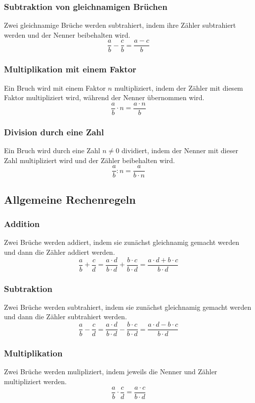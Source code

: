 \subsubsection{Subtraktion von gleichnamigen Brüchen}
Zwei gleichnamige Brüche werden subtrahiert, indem ihre Zähler subtrahiert werden und der Nenner beibehalten wird.
	\[\frac{a}{b} - \frac{c}{b} = \frac{a-c}{b}\]
	
\subsubsection{Multiplikation mit einem Faktor}
Ein Bruch wird mit einem Faktor $n$ multipliziert, indem der Zähler mit diesem Faktor multipliziert wird, während der Nenner übernommen wird.
	\[\frac{a}{b} \cdot n = \frac{a \cdot n}{b}\]
	
\subsubsection{Division durch eine Zahl}
Ein Bruch wird durch eine Zahl $n \neq 0$ dividiert, indem der Nenner mit dieser Zahl multipliziert wird und der Zähler beibehalten wird.
	\[\frac{a}{b} : n = \frac{a}{b \cdot n}\]

\subsection{Allgemeine Rechenregeln}
\subsubsection{Addition}
Zwei Brüche werden addiert, indem sie zunächst gleichnamig gemacht werden und dann die Zähler addiert werden.
	\[\frac{a}{b} + \frac{c}{d} = \frac{a \cdot d}{b \cdot d} + \frac{b \cdot c}{b \cdot d} = \frac{a \cdot d + b \cdot c}{b \cdot d} \]
	
\subsubsection{Subtraktion}
Zwei Brüche werden subtrahiert, indem sie zunächst gleichnamig gemacht werden und dann die Zähler subtrahiert werden.
	\[\frac{a}{b} - \frac{c}{d} = \frac{a \cdot d}{b \cdot d} - \frac{b \cdot c}{b \cdot d} = \frac{a \cdot d - b \cdot c}{b \cdot d} \] 
	
\subsubsection{Multiplikation}
Zwei Brüche werden mulipliziert, indem jeweils die Nenner und Zähler multipliziert werden.
	\[\frac{a}{b} \cdot \frac{c}{d} = \frac{a \cdot c}{b \cdot d}\]


